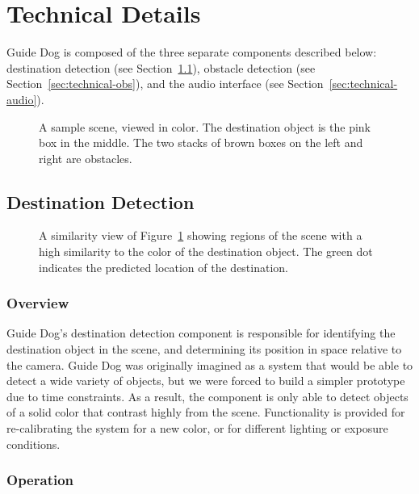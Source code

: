 \section{Technical Details}
\label{sec:technical}

Guide Dog is composed of the three separate components described below: destination detection
(see Section~\ref{sec:technical-dest}),
obstacle detection (see Section~\ref{sec:technical-obs}), and the audio
interface (see Section~\ref{sec:technical-audio}).

\begin{figure}
\caption{A sample scene, viewed in color. The destination object is the pink box
  in the middle. The two stacks of brown boxes on the left and right are
  obstacles.}
\label{fig:color}
\end{figure}

\subsection{Destination Detection}
\label{sec:technical-dest}

\begin{figure}
\caption{A similarity view of Figure~\ref{fig:color} showing regions of the scene with a high similarity
to the color of the destination object. The green dot indicates the predicted location of the destination.}
\label{fig:destination}
\end{figure}

\subsubsection{Overview}
\label{sec:technical-dest-overview}

Guide Dog's destination detection component is responsible for identifying the
destination object in the scene, and determining its position in space
relative to the camera. Guide Dog was originally imagined as a system that
would be able to detect a wide variety of objects, but we were forced to
build a simpler prototype due to time constraints. As a result, the component 
is only able to detect objects of a solid color that contrast highly from the 
scene. Functionality is provided for re-calibrating the system for a new color, 
or for different lighting or exposure conditions. 

\subsubsection{Operation}
\label{sec:technical-dest-op}

